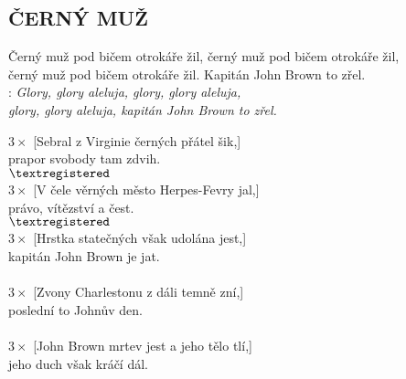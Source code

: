 \begin{flushleft}
	\section*{\Huge ČERNÝ MUŽ}
\end{flushleft}
Černý muž pod bičem otrokáře žil, černý muž pod bičem otrokáře žil,\\
černý muž pod bičem otrokáře žil. Kapitán John Brown to zřel.\\
 
\textregistered:
\emph{
Glory, glory aleluja, glory, glory aleluja,\\
glory, glory aleluja, kapitán John Brown to zřel.\\
}

$3\times$ [Sebral z Virginie černých přátel šik,]\\
prapor svobody tam zdvih.\\
$\textregistered$\\

$3\times$ [V čele věrných město Herpes-Fevry jal,]\\
právo, vítězství a čest.\\
$\textregistered$\\

$3\times$ [Hrstka statečných však udolána jest,]\\
kapitán John Brown je jat.\\
\textregistered\\

$3\times$ [Zvony Charlestonu z dáli temně zní,]\\
poslední to Johnův den.\\
\textregistered\\

$3\times$ [John Brown mrtev jest a jeho tělo tlí,]\\
jeho duch však kráčí dál.\\
\textregistered
\newpage
